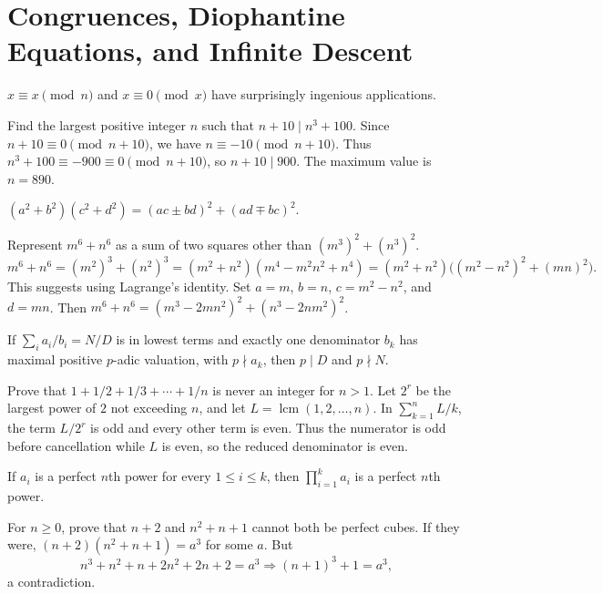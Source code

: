 \documentclass[11pt,a4paper]{article}
\begin{document}
\section*{Congruences, Diophantine Equations, and Infinite Descent}
\setcounter{theorem}{45}\begin{lemma}
$x\equiv x\pmod n$ and $x\equiv0\pmod x$ have surprisingly ingenious applications.
\end{lemma}
Find the largest positive integer $n$ such that $n+10\mid n^3+100$.
Since $n+10\equiv0\pmod{n+10}$, we have $n\equiv-10\pmod{n+10}$.
Thus $n^3+100\equiv-900\equiv0\pmod{n+10}$, so $n+10\mid900$.
The maximum value is $n=890$.

\setcounter{theorem}{46}\begin{lemma}
$(a^2+b^2)(c^2+d^2)=(ac\pm bd)^2+(ad\mp bc)^2$.
\end{lemma}
Represent $m^6+n^6$ as a sum of two squares other than $(m^3)^2+(n^3)^2$.
\[
m^6+n^6=(m^2)^3+(n^2)^3
=(m^2+n^2)(m^4-m^2n^2+n^4)
=(m^2+n^2)\bigl((m^2-n^2)^2+(mn)^2\bigr).
\]
This suggests using Lagrange's identity. Set $a=m$, $b=n$, $c=m^2-n^2$, and $d=mn$.
Then $m^6+n^6=(m^3-2mn^2)^2+(n^3-2nm^2)^2$.

\setcounter{theorem}{47}\begin{lemma}
If $\sum_i a_i/b_i=N/D$ is in lowest terms and exactly one denominator $b_k$ has maximal positive $p$-adic valuation, with $p\nmid a_k$, then $p\mid D$ and $p\nmid N$.
\end{lemma}
Prove that $1+1/2+1/3+\cdots+1/n$ is never an integer for $n>1$.
Let $2^r$ be the largest power of $2$ not exceeding $n$, and let $L=\operatorname{lcm}(1,2,\ldots,n)$.
In $\sum_{k=1}^n L/k$, the term $L/2^r$ is odd and every other term is even.
Thus the numerator is odd before cancellation while $L$ is even, so the reduced denominator is even.

\setcounter{theorem}{48}\begin{lemma}
If $a_i$ is a perfect $n$th power for every $1\leq i\leq k$, then $\prod_{i=1}^k a_i$ is a perfect $n$th power.
\end{lemma}
For $n\geq0$, prove that $n+2$ and $n^2+n+1$ cannot both be perfect cubes.
If they were, $(n+2)(n^2+n+1)=a^3$ for some $a$. But
\[
n^3+n^2+n+2n^2+2n+2=a^3
\Longrightarrow(n+1)^3+1=a^3,
\]
a contradiction.
\end{document}
